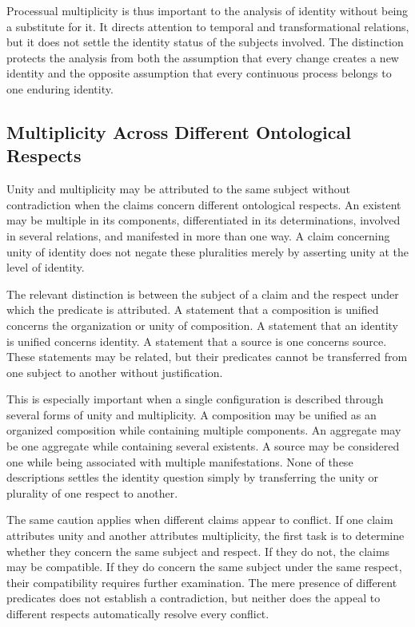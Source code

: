Processual multiplicity is thus important to the analysis
of identity without being a substitute for it. It directs
attention to temporal and transformational relations, but
it does not settle the identity status of the subjects
involved. The distinction protects the analysis from both
the assumption that every change creates a new identity
and the opposite assumption that every continuous process
belongs to one enduring identity.

\subsection{Multiplicity Across Different Ontological Respects}

Unity and multiplicity may be attributed to the same subject
without contradiction when the claims concern different
ontological respects. An existent may be multiple in its
components, differentiated in its determinations, involved
in several relations, and manifested in more than one way.
A claim concerning unity of identity does not negate these
pluralities merely by asserting unity at the level of identity.

The relevant distinction is between the subject of a claim
and the respect under which the predicate is attributed.
A statement that a composition is unified concerns the
organization or unity of composition. A statement that
an identity is unified concerns identity. A statement
that a source is one concerns source. These statements
may be related, but their predicates cannot be transferred
from one subject to another without justification.

This is especially important when a single configuration
is described through several forms of unity and multiplicity.
A composition may be unified as an organized composition
while containing multiple components. An aggregate may
be one aggregate while containing several existents.
A source may be considered one while being associated
with multiple manifestations. None of these descriptions
settles the identity question simply by transferring
the unity or plurality of one respect to another.

The same caution applies when different claims appear
to conflict. If one claim attributes unity and another
attributes multiplicity, the first task is to determine
whether they concern the same subject and respect.
If they do not, the claims may be compatible. If they
do concern the same subject under the same respect,
their compatibility requires further examination.
The mere presence of different predicates does not
establish a contradiction, but neither does the appeal
to different respects automatically resolve every conflict.

